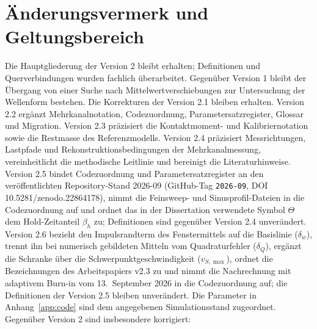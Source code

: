 \documentclass[11pt,a4paper]{article}
\begin{document}
\section*{Änderungsvermerk und Geltungsbereich}
Die Hauptgliederung der Version 2 bleibt erhalten; Definitionen und Querverbindungen wurden fachlich überarbeitet. Gegenüber Version 1 bleibt der Übergang von einer Suche nach Mittelwertverschiebungen zur Untersuchung der Wellenform bestehen. Die Korrekturen der Version 2.1 bleiben erhalten. Version 2.2 ergänzt Mehrkanalnotation, Codezuordnung, Parametersatzregister, Glossar und Migration. Version 2.3 präzisiert die Kontaktmoment- und Kalibriernotation sowie die Restmasse des Referenzmodells. Version 2.4 präzisiert Messrichtungen, Lastpfade und Rekonstruktionsbedingungen der Mehrkanalmessung, vereinheitlicht die methodische Leitlinie und bereinigt die Literaturhinweise. Version 2.5 bindet Codezuordnung und Parametersatzregister an den veröffentlichten Repository-Stand 2026-09 (GitHub-Tag \texttt{2026-09}, DOI 10.5281/zenodo.22864178), nimmt die Feinsweep- und Sinusprofil-Dateien in die Codezuordnung auf und ordnet das in der Dissertation verwendete Symbol $\Theta$ dem Hold-Zeitanteil $\beta_h$ zu; Definitionen sind gegenüber Version 2.4 unverändert. Version 2.6 bezieht den Impulsrandterm des Fenstermittels auf die Basislinie ($\delta_w$), trennt ihn bei numerisch gebildeten Mitteln vom Quadraturfehler ($\delta_Q$), ergänzt die Schranke über die Schwerpunktgeschwindigkeit ($v_{S,\max}$), ordnet die Bezeichnungen des Arbeitspapiers v2.3 zu und nimmt die Nachrechnung mit adaptivem Burn-in vom 13.~September 2026 in die Codezuordnung auf; die Definitionen der Version 2.5 bleiben unverändert. Die Parameter in Anhang~\ref{app:code} sind dem angegebenen Simulationsstand zugeordnet. Gegenüber Version 2 sind insbesondere korrigiert:
\end{document}
